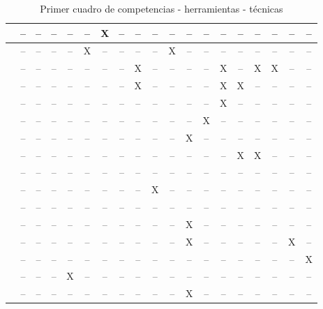 \begin{landscape}
\begin{table}[H]
\begin{center}
\begin{tabular}{| c | c | c | c | c | c | c | c | c | c | c | c | c | c | c | c | c | c | c |}
    \hline
    \cite{Mohamed:2008} 		& -- & -- & --  & -- & --  & X  & -- & -- & -- & -- & -- & -- & -- & -- & -- & -- & -- & -- \\
    \hline
    \cite{Piedra:2010} 			& -- & -- & --  & -- & X  & -- & -- & -- & -- & X  & -- & -- & -- & -- & --  & -- & -- & -- \\
    \hline
    \cite{Liao:2013} 			& -- & -- & --  & -- & -- & -- & -- & X   & -- & -- & -- & -- & X  & -- & X & X & -- & -- \\
    \hline
    \cite{Colomo-Palacios:2013} 	& -- & -- & --  & -- & -- & -- & -- & X   & -- & -- & -- & -- & X  & X & -- & -- & -- & -- \\
    \hline
    \cite{McMahon:2007} 		& -- & -- & --   & -- & -- & -- & -- & --  & -- & -- & -- & -- & X  & -- & -- & -- & -- & -- \\
    \hline
    \cite{Rashid:2008} 			& -- & -- & --   & -- & -- & -- & -- & --  & -- &  -- & -- & X & -- & -- & -- & --  & -- & -- \\
    \hline
    \cite{Lim:2011} 			& -- & -- & --   & -- & -- & -- & -- & --  & -- & -- & X & --  & -- & -- & -- & -- & -- & -- \\
    \hline
    \cite{Achcaoucaou:2012} 		& -- & -- & --   & -- & -- & -- & --  & -- & -- & -- & -- & -- & -- & X & X & --  & -- & -- \\
    \hline
    \cite{Guenaga:2013} 		& -- & -- & --   & -- & -- & -- & -- & -- & -- & --  & -- & -- & -- & -- & -- & --  & -- & -- \\
    \hline
    \cite{Martin-Cuadrado:2013} 	& -- & -- & --   & -- & -- & --& -- & --  & X  & -- & -- & -- & -- & -- & -- & -- & -- & -- \\
    \hline
    \cite{Mohamed:2008a} 		& -- & -- & --   & -- & -- & -- & -- & -- & -- & --  & -- & -- & -- & -- & -- & -- & -- & --  \\
    \hline
    \cite{Gil:2011} 			& -- & -- & --   & -- & -- & -- & -- & --  & -- & -- & X & --  & -- & -- & -- & -- & -- & -- \\
    \hline
    \cite{Velasco:2012}			& -- & -- & --   & -- & -- & -- & -- & --  & -- & -- & X & --  & -- & -- & -- & -- & X  & -- \\
    \hline
    \cite{Borrajo:2010}			& -- & -- & --   & -- & -- & -- & -- & --  & -- & -- & -- & --  & -- & -- & -- & --  & -- & X \\
    \hline
    \cite{Bedek:2011}			& -- & -- & --   & X & -- & -- & -- & --  & -- & -- & -- & --  & -- & -- & -- & --  & -- & -- \\
    \hline
    \cite{Palomares:2011}		& -- & -- & --   & -- & -- & -- & -- & --  & -- & -- & X & --  & -- & -- & -- & -- & -- & -- \\
    \hline
  \end{tabular}
\end{center}
\caption{Primer cuadro de competencias - herramientas - técnicas}
\label{tab:CuadroPreguntas1}
\end{table} 


\end{landscape}

